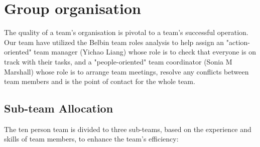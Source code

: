 \documentclass{article}
\begin{document}
\section{Group organisation}
The quality of a team's organisation is pivotal to a team's successful operation. 
Our team have utilized the Belbin team roles analysis \cite{belbin2012team} to help assign an "action-oriented" team manager (Yichao Liang) whose role is to check that everyone is on track with their tasks, and a "people-oriented" team coordinator (Sonia M Marshall) whose role is to arrange team meetings, resolve any conflicts between team members and is the point of contact for the whole team.

\subsection{Sub-team Allocation}
The ten person team is divided to three sub-teams, based on the experience and skills of team members, to enhance the team's efficiency:
\end{document}
